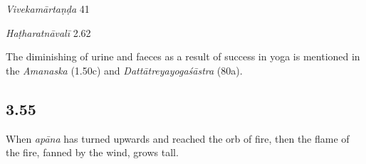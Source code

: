 \begin{ekdosis}
\begin{sources}[hp03_054]
\emph{Vivekamārtaṇḍa} 41
\begin{versinnote}
\end{versinnote}

\end{sources}

\begin{testimonia}[hp03_054]
\emph{Haṭharatnāvalī} 2.62
\begin{versinnote}
\end{versinnote}
\end{testimonia}

\begin{philcomm}[hp03_054]
The diminishing of urine and faeces as a result of success in yoga is mentioned in the \emph{Amanaska} (1.50c) and \emph{Dattātreyayogaśāstra} (80a).
\end{philcomm}

\subsection*{3.55}
\begin{translation}[hp03_055]
When \emph{apāna} has turned upwards and reached the orb of fire, then the flame of the fire, fanned by the wind, grows tall.
\end{translation}


\end{ekdosis}
